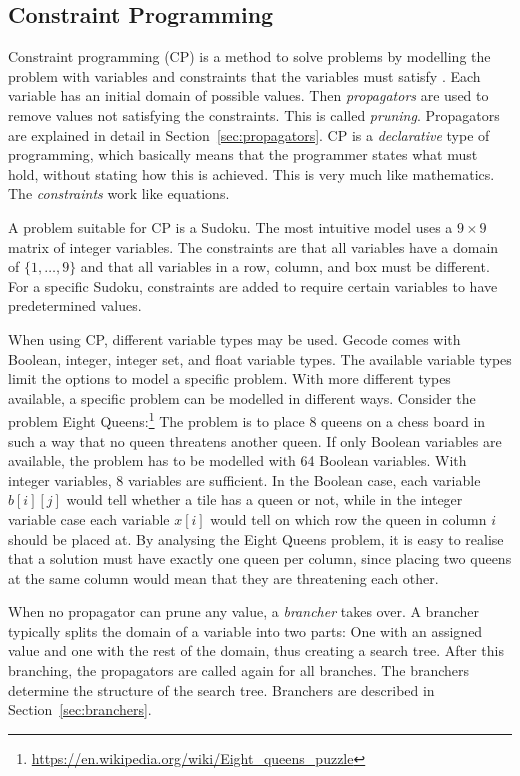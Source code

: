 \documentclass[a4paper,11pt]{article}
\begin{document}
\subsection{Constraint Programming}
\label{sec:constraintp}
Constraint programming (CP) is a method to solve problems by modelling the problem with variables and constraints that the variables must satisfy \cite{FruehwirthMS06}. Each variable has an initial domain of possible values. Then \textit{propagators} are used to remove values not satisfying the constraints. This is called \textit{pruning}. Propagators are explained in detail in Section~\ref{sec:propagators}. CP is a \textit{declarative} type of programming, which basically means that the programmer states what must hold, without stating how this is achieved. This is very much like mathematics. The \textit{constraints} work like equations.

A problem suitable for CP is a Sudoku. The most intuitive model uses a $9\times9$ matrix of integer variables. The constraints are that all variables have a domain of $\{1,\ldots,9\}$ and that all variables in a row, column, and box must be different. For a specific Sudoku, constraints are added to require certain variables to have predetermined values.

When using CP, different variable types may be used. Gecode comes with Boolean, integer, integer set, and float variable types. The available variable types limit the options to model a specific problem. With more different types available, a specific problem can be modelled in different ways. Consider the problem Eight Queens:\footnote{\url{https://en.wikipedia.org/wiki/Eight_queens_puzzle}} The problem is to place 8 queens on a chess board in such a way that no queen threatens another queen. If only Boolean variables are available, the problem has to be modelled with 64 Boolean variables. With integer variables, 8 variables are sufficient. In the Boolean case, each variable $b[i][j]$ would tell whether a tile has a queen or not, while in the integer variable case each variable $x[i]$ would tell on which row the queen in column $i$ should be placed at. By analysing the Eight Queens problem, it is easy to realise that a solution must have exactly one queen per column, since placing two queens at the same column would mean that they are threatening each other. 

When no propagator can prune any value, a \textit{brancher} takes over. A brancher typically splits the domain of a variable into two parts: One with an assigned value and one with the rest of the domain, thus creating a search tree. After this branching, the propagators are called again for all branches. The branchers determine the structure of the search tree. Branchers are described in Section~\ref{sec:branchers}. 
\end{document}
